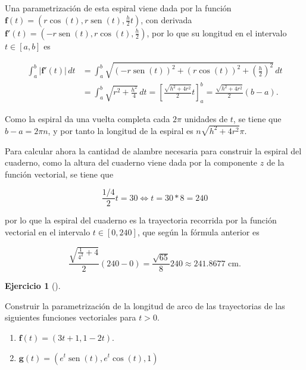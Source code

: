 \documentclass[
  a4paper,
]{scrreport}
\theoremstyle{definition}
\newtheorem{exercise}{Ejercicio}[chapter]
\theoremstyle{remark}
\begin{document}
\begin{tcolorbox}[enhanced jigsaw, left=2mm, coltitle=black, colbacktitle=quarto-callout-tip-color!10!white, opacitybacktitle=0.6, colback=white, breakable, titlerule=0mm, toptitle=1mm, rightrule=.15mm, bottomtitle=1mm, bottomrule=.15mm, toprule=.15mm, leftrule=.75mm, arc=.35mm, opacityback=0, title=\textcolor{quarto-callout-tip-color}{\faLightbulb}\hspace{0.5em}{Solución}, colframe=quarto-callout-tip-color-frame]

Una parametrización de esta espiral viene dada por la función
\(\mathbf{f}(t) = (r\cos(t),r\operatorname{sen}(t),\frac{h}{2}t)\), con
derivada
\(\mathbf{f}'(t) = (-r\operatorname{sen}(t),r\cos(t), \frac{h}{2})\),
por lo que su longitud en el intervalo \(t\in[a,b]\) es

\begin{align*}
\int_a^b |\mathbf{f}'(t)|\,dt 
&= \int_a^b \sqrt{(-r\operatorname{sen}(t))^2+(r\cos(t))^2+\left(\frac{h}{2}\right)^2}\, dt \\
&= \int_a^b \sqrt{r^2+\frac{h^2}{4}}\, dt 
= \left[\frac{\sqrt{h^2+4r^2}}{2}t\right]_a^b
= \frac{\sqrt{h^2+4r^2}}{2}(b-a).
\end{align*}

Como la espiral da una vuelta completa cada \(2\pi\) unidades de \(t\),
se tiene que \(b-a=2\pi n\), y por tanto la longitud de la espiral es
\(n\sqrt{h^2+4r^2}\pi\).

Para calcular ahora la cantidad de alambre necesaria para construir la
espiral del cuaderno, como la altura del cuaderno viene dada por la
componente \(z\) de la función vectorial, se tiene que

\[
\frac{1/4}{2}t = 30 \Leftrightarrow t = 30 * 8 = 240
\]

por lo que la espiral del cuaderno es la trayectoria recorrida por la
función vectorial en el intervalo \(t\in [0,240]\), que según la fórmula
anterior es

\[
\frac{\sqrt{\frac{1}{4^2}+4}}{2}(240-0) = \frac{\sqrt{65}}{8}240 \approx 241.8677 \mbox{ cm}. 
\]

\end{tcolorbox}

\begin{exercise}[]\protect\hypertarget{exr-parametrizacion-longitud-arco}{}\label{exr-parametrizacion-longitud-arco}

Construir la parametrización de la longitud de arco de las trayectorias
de las siguientes funciones vectoriales para \(t>0\).

\begin{enumerate}
\def\labelenumi{\alph{enumi}.}
\item
  \(\mathbf{f}(t)=(3t+1, 1-2t).\)
\item
  \(\mathbf{g}(t)=(e^t\operatorname{sen}(t), e^t\cos(t), 1)\)
\end{enumerate}

\end{exercise}
\end{document}
